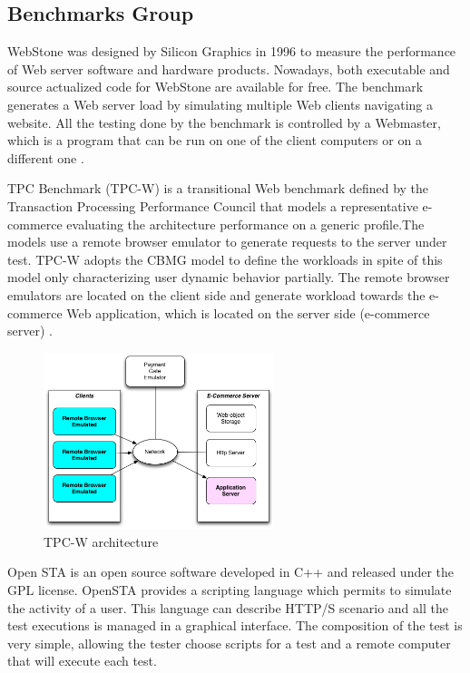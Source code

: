 \documentclass[espaco=umemeio,chapter=TITLE,twoside,openright]{abnt}
\begin{document}
\subsection{Benchmarks Group}

WebStone was designed by Silicon Graphics in 1996 to measure the performance of Web server software and hardware products. Nowadays, both executable and source actualized code for WebStone are available for free. The benchmark generates a Web server load by simulating multiple Web clients navigating a website. All the testing done by the benchmark is controlled by a Webmaster, which is a program that can be run on one of the client computers or on a different one \cite{MohammadS.Obaidat} \cite{Trent1995} .

TPC Benchmark (TPC-W) is a transitional Web benchmark defined by the Transaction Processing Performance Council that models a representative e-commerce evaluating the architecture performance on a generic profile.The models use a remote browser emulator to generate requests to the server under test. TPC-W adopts the CBMG model to define the workloads in spite of this model only characterizing user dynamic behavior partially. The remote browser emulators are located on the client side and generate workload towards the e-commerce Web application, which is located on the server side (e-commerce server) \cite{MohammadS.Obaidat} \cite{Menasce2002a}.

\begin{figure}[h]
\centering
\includegraphics[width=0.6\textwidth]{./images/tpcw.png}
\caption{TPC-W architecture \cite{MohammadS.Obaidat} \cite{Menasce2002a}}
\label{fig:tpcw}
\end{figure}


Open STA is an open source software developed in C++ and released under the GPL license. OpenSTA provides a scripting language which permits to simulate the activity of a user. This language can describe HTTP/S scenario and all the test executions is managed in a graphical interface. The composition of the test is
very simple, allowing the tester choose scripts for a test and a remote computer that will execute each test.
\end{document}
